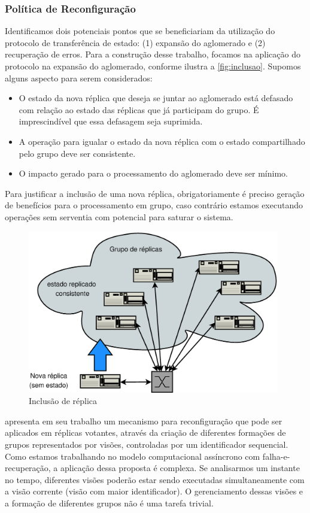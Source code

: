 \subsubsection{Política de Reconfiguração}

Identificamos dois potenciais pontos que se beneficiariam da utilização do protocolo de
transferência de estado: (1) expansão do aglomerado e (2) recuperação de erros. Para a
construção desse trabalho, focamos na aplicação do protocolo na expansão do aglomerado,
conforme ilustra a \autoref{fig:inclusao}. Supomos alguns aspecto para serem considerados:

\begin{itemize}
  \item O estado da nova réplica que deseja se juntar ao aglomerado está defasado com
    relação ao estado das réplicas que já participam do grupo. É imprescindível que essa
    defasagem seja suprimida.
  \item A operação para igualar o estado da nova réplica com o estado compartilhado pelo
    grupo deve ser consistente.
  \item O impacto gerado para o processamento do aglomerado deve ser mínimo.
\end{itemize}

Para justificar a inclusão de uma nova réplica, obrigatoriamente é preciso geração de
benefícios para o processamento em grupo, caso contrário estamos executando operações sem
serventia com potencial para saturar o sistema.

\begin{figure}[ht]
  \centering
  \includegraphics[width=11cm]{conteudo/capitulos/figuras/inclusao_replica_cluster.eps}
  \caption{Inclusão de réplica}
  \label{fig:inclusao}
\end{figure}

 apresenta em seu trabalho um mecanismo para reconfiguração que pode
ser aplicados em réplicas votantes, através da criação de diferentes formações de grupos
representados por visões, controladas por um identificador sequencial. Como estamos
trabalhando no modelo computacional assíncrono com falha-e-recuperação, a aplicação dessa
proposta é complexa. Se analisarmos um instante no tempo, diferentes visões poderão estar
sendo executadas simultaneamente com a visão corrente (visão com maior identificador). O
gerenciamento dessas visões e a formação de diferentes grupos não é uma tarefa trivial.

